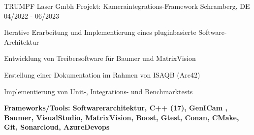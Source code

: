 \cventry
{TRUMPF Laser Gmbh} %
{Projekt:  Kameraintegrations-Framework} %
{Schramberg, DE} %
{04/2022 - 06/2023} %
\begin{cvitems}
	\item{Iterative Erarbeitung und Implementierung eines pluginbasierte Software-Architektur}
	\item{Entwicklung von Treibersoftware für Baumer und MatrixVision}
	\item{Erstellung einer Dokumentation im Rahmen von ISAQB (Arc42)}
	\item{Implementierung von Unit-, Integrations- und Benchmarktests}
	\item{\textbf{Frameworks/Tools:  Softwarerarchitektur, C++ (17), GenICam , Baumer, VisualStudio, MatrixVision, Boost, Gtest, Conan, CMake, Git, Sonarcloud, AzureDevops}}
\end{cvitems}
